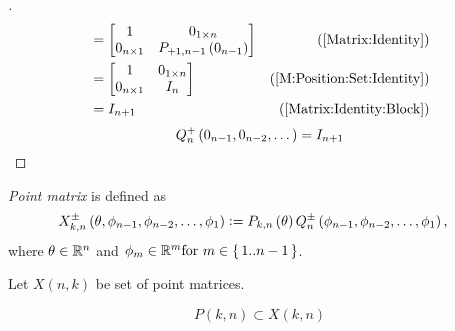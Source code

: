 \documentclass[../main.tex]{subfiles}
\begin{document}
\begin{proof}[]
\begin{align*}
                                                                                                       & =
        \begin{bmatrix}
            1             & 0_{1\times n}                  \\
            0_{n\times 1} & P_{+1,n-1}\left(0_{n-1}\right) \\
        \end{bmatrix}                                              & \text{(\cref{Matrix:Identity})}                                           \\
                                                                                                       & =
        \begin{bmatrix}
            1             & 0_{1\times n} \\
            0_{n\times 1} & I_{n}         \\
        \end{bmatrix}                                                               & \text{(\cref{M:Position:Set:Identity})}                  \\
                                                                                                       & =
        I_{n+1}                                                                                        & \text{(\cref{Matrix:Identity:Block})}
    \end{align*}
    \begin{equation*}
        Q^+_n
        \left(0_{n-1}, 0_{n-2}, \dots\right)
        =
        I_{n+1}
        \qedhere
    \end{equation*}
\end{proof}
\begin{definition}\label{M:Point}
    \textit{Point matrix} is defined as
    \begin{align*}
        X^\pm_{k,n}\left(\theta,\phi_{n-1},\phi_{n-2},\dots,\phi_1\right) & \vcentcolon=
        P_{k,n}\left(\theta\right)
        Q^\pm_n\left(\phi_{n-1},\phi_{n-2},\dots,\phi_1\right)\text{,}
    \end{align*}
    where $\theta\in\mathbb{R}^n$ and $\phi_m\in\mathbb{R}^m \text{for } m\in\set{1..n-1}$.
\end{definition}
\begin{definition}\label{M:Point:Set}
    Let $X\left(n,k\right)$ be set of point matrices.
\end{definition}
\begin{corollary}\label{M:Point:Position}
    \begin{equation*}
        P\left(k,n\right)\subset X\left(k,n\right)
    \end{equation*}
\end{corollary}
\end{document}
